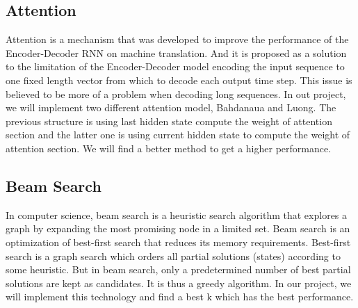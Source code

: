 \documentclass[sigconf]{acmart}
\begin{document}
\subsection{Attention}
Attention is a mechanism that was developed to improve the performance of the Encoder-Decoder RNN on machine translation. And it is proposed as a solution to the limitation of the Encoder-Decoder model encoding the input sequence to one fixed length vector from which to decode each output time step. This issue is believed to be more of a problem when decoding long sequences. In out project, we will implement two different attention model, Bahdanaua and Luong. The previous structure is using last hidden state compute the weight of attention section and the latter one is using current hidden state to compute the weight of attention section. We will find a better method to get a higher performance. 

\subsection{Beam Search}
In computer science, beam search is a heuristic search algorithm that explores a graph by expanding the most promising node in a limited set. Beam search is an optimization of best-first search that reduces its memory requirements. Best-first search is a graph search which orders all partial solutions (states) according to some heuristic. But in beam search, only a predetermined number of best partial solutions are kept as candidates. It is thus a greedy algorithm. In our project, we will implement this technology and find a best k which has the best performance.
\end{document}
